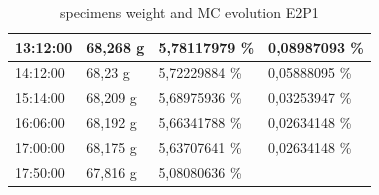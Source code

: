 \begin{table}[]
\begin{tabular}{llll}
		\multicolumn{1}{|l|}{13:12:00} & \multicolumn{1}{l|}{68,268 g} & \multicolumn{1}{l|}{5,78117979   \%} & \multicolumn{1}{l|}{0,08987093 \%} \\ \hline
		\multicolumn{1}{|l|}{14:12:00} & \multicolumn{1}{l|}{68,23 g} & \multicolumn{1}{l|}{5,72229884   \%} & \multicolumn{1}{l|}{0,05888095 \%} \\ \hline
		\multicolumn{1}{|l|}{15:14:00} & \multicolumn{1}{l|}{68,209 g} & \multicolumn{1}{l|}{5,68975936   \%} & \multicolumn{1}{l|}{0,03253947 \%} \\ \hline
		\multicolumn{1}{|l|}{16:06:00} & \multicolumn{1}{l|}{68,192 g} & \multicolumn{1}{l|}{5,66341788   \%} & \multicolumn{1}{l|}{0,02634148 \%} \\ \hline
		\multicolumn{1}{|l|}{17:00:00} & \multicolumn{1}{l|}{68,175 g} & \multicolumn{1}{l|}{5,63707641   \%} & \multicolumn{1}{l|}{0,02634148 \%} \\ \hline
		\multicolumn{1}{|l|}{17:50:00} & \multicolumn{1}{l|}{67,816 g} & \multicolumn{1}{l|}{\cellcolor[HTML]{FFC000}5,08080636   \%} &  \\ \cline{1-3}
	\end{tabular}
	\caption{specimens weight and MC evolution E2P1}
	\label{tab:Tab7}
\end{table}
